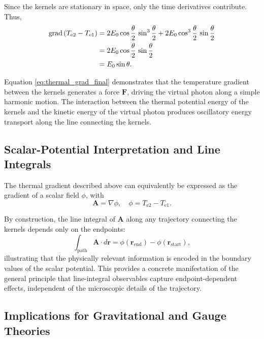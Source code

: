 \documentclass[%
 reprint,
 amsmath,amssymb,
 aps,
 prb,
]{revtex4-2}
\numberwithin{equation}{section}
\begin{document}
Since the kernels are stationary in space, only the time derivatives contribute. Thus,
\begin{align}
\mathrm{grad} \left( T_{\mathrm{e2}} - T_{\mathrm{e1}} \right)
&= 2 E_0 \cos \frac{\theta}{2} \, \sin^3 \frac{\theta}{2} + 2 E_0 \cos^3 \frac{\theta}{2} \, \sin \frac{\theta}{2} \notag \\
&= 2 E_0 \cos \frac{\theta}{2} \, \sin \frac{\theta}{2} \notag \\
&= E_0 \sin \theta.
\label{eq:thermal_grad_final}
\end{align}

Equation \eqref{eq:thermal_grad_final} demonstrates that the temperature gradient between the kernels generates a force $\mathbf{F}$, driving the virtual photon along a simple harmonic motion. The interaction between the thermal potential energy of the kernels and the kinetic energy of the virtual photon produces oscillatory energy transport along the line connecting the kernels.

\subsection{Scalar-Potential Interpretation and Line Integrals}
\label{sec:scalar_potential_line_integral}

The thermal gradient described above can equivalently be expressed as the gradient of a scalar field $\phi$, with
\begin{equation}
\mathbf{A} = \nabla \phi, \quad \phi = T_{\mathrm{e2}} - T_{\mathrm{e1}}.
\end{equation}

By construction, the line integral of $\mathbf{A}$ along any trajectory connecting the kernels depends only on the endpoints:
\begin{equation}
\int_\mathrm{path} \mathbf{A} \cdot d\mathbf{r} = \phi(\mathbf{r}_\mathrm{end}) - \phi(\mathbf{r}_\mathrm{start}),
\end{equation}
illustrating that the physically relevant information is encoded in the boundary values of the scalar potential. This provides a concrete manifestation of the general principle that line-integral observables capture endpoint-dependent effects, independent of the microscopic details of the trajectory.

\subsection{Implications for Gravitational and Gauge Theories}
\label{sec:implications_gravity_gauge}
\end{document}
